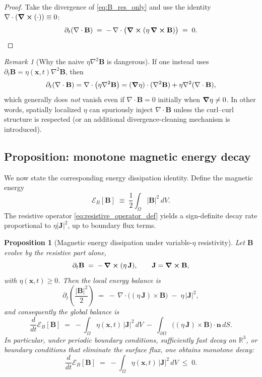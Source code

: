 \documentclass[11pt]{article}
\theoremstyle{plain}
\newtheorem{proposition}{Proposition}
\theoremstyle{definition}
\theoremstyle{remark}
\newtheorem{remark}{Remark}
\newcommand{\R}{\mathbb{R}}
\newcommand{\diver}{\nabla\cdot}
\newcommand{\B}{\mathbf{B}}
\newcommand{\J}{\mathbf{J}}
\begin{document}
\begin{proof}
Take the divergence of \eqref{eq:B_res_only} and use the identity $\diver(\curl(\cdot))\equiv 0$:
\[
\partial_t(\diver\B) \;=\; -\,\diver\big(\curl(\eta\,\curl\B)\big) \;=\; 0.
\]
\end{proof}

\begin{remark}[Why the naive $\eta\nabla^2\B$ is dangerous]\label{rem:naive_eta_laplacian_divB}
If one instead uses $\partial_t\B=\eta(\mathbf{x},t)\nabla^2\B$, then
\[
\partial_t(\diver\B)=\diver\big(\eta\nabla^2\B\big)
=(\grad\eta)\cdot(\nabla^2\B)+\eta\nabla^2(\diver\B),
\]
which generally does \emph{not} vanish even if $\diver\B=0$ initially when $\grad\eta\neq 0$. In other
words, spatially localized $\eta$ can spuriously inject $\diver\B$ unless the curl--curl structure is
respected (or an additional divergence-cleaning mechanism is introduced).
\end{remark}

\subsection{Proposition: monotone magnetic energy decay}\label{sec:result_vector_energy}
We now state the corresponding energy dissipation identity. Define the magnetic energy
\begin{equation}\label{eq:mag_energy_R2}
  \mathcal{E}_B[\B] \;\equiv\; \frac{1}{2}\int_{\Omega}|\B|^2\,dV.
\end{equation}
The resistive operator \eqref{eq:resistive_operator_def} yields a sign-definite decay rate proportional
to $\eta|\J|^2$, up to boundary flux terms.

\begin{proposition}[Magnetic energy dissipation under variable-$\eta$ resistivity]\label{prop:energy_decay}
Let $\B$ evolve by the resistive part alone,
\begin{equation}\label{eq:B_res_only_energy}
  \partial_t \B \;=\; -\,\curl(\eta\,\J),
  \qquad \J=\curl\B,
\end{equation}
with $\eta(\mathbf{x},t)\ge 0$. Then the local energy balance is
\begin{equation}\label{eq:local_energy_balance}
  \partial_t\!\left(\frac{|\B|^2}{2}\right)
  \;=\;
  -\,\diver\!\big((\eta\,\J)\times\B\big)
  \;-\;
  \eta\,|\J|^2,
\end{equation}
and consequently the global balance is
\begin{equation}\label{eq:global_energy_balance}
  \frac{d}{dt}\mathcal{E}_B[\B]
  \;=\;
  -\int_{\Omega}\eta(\mathbf{x},t)\,|\J|^2\,dV
  \;-\;
  \int_{\partial\Omega}\big((\eta\,\J)\times\B\big)\cdot\mathbf{n}\,dS.
\end{equation}
In particular, under periodic boundary conditions, sufficiently fast decay on $\R^3$, or boundary
conditions that eliminate the surface flux, one obtains monotone decay:
\begin{equation}\label{eq:energy_decay_monotone}
  \frac{d}{dt}\mathcal{E}_B[\B]
  \;=\;
  -\int_{\Omega}\eta(\mathbf{x},t)\,|\J|^2\,dV
  \;\le\; 0.
\end{equation}
\end{proposition}
\end{document}
